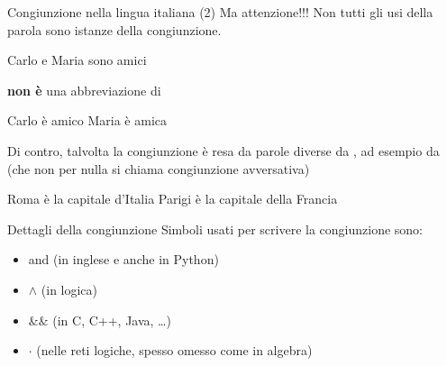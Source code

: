\documentclass[aspectratio=169,10pt,dvipsnames,handout]{beamer}
\begin{document}
\begin{frame}{Congiunzione nella lingua italiana (2)}
    Ma attenzione!!! Non tutti gli usi della parola  sono istanze della congiunzione.
    \begin{example}
        Carlo e Maria sono amici\medskip

        \pause
        \hspace{2cm} \textbf{non è} una abbreviazione di\medskip

        Carlo è amico  Maria è amica\medskip
    \end{example}

    \pause
    \medskip
    Di contro, talvolta la congiunzione è resa da parole diverse da , ad esempio da  (che non per nulla si chiama \alert{congiunzione avversativa})

    \begin{example}
        Roma è la capitale d'Italia  Parigi è la capitale della Francia
    \end{example}
\end{frame}

\begin{frame}{Dettagli della congiunzione}
    Simboli usati per scrivere la congiunzione sono:
    \begin{itemize}
        \item \alert{and (in inglese e anche in Python)}
        \item \alert{$\wedge$ (in logica)}
        \item $\texttt{\&\&}$ (in C, C++, Java, \ldots)
        \item $\cdot$ (nelle reti logiche, spesso omesso come in algebra)
    \end{itemize}

\end{frame}
\end{document}
